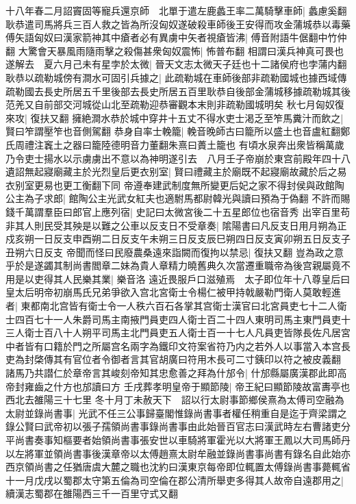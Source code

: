 十八年春二月詔竇固等寵兵還京師　北單于遣左鹿蠡王率二萬騎擊車師|{
	蠡慮奚翻}
耿恭遣司馬將兵三百人救之皆為所沒匈奴遂破殺車師後王安得而攻金蒲城恭以毒藥傅矢語匈奴曰漢家箭神其中瘡者必有異虜中矢者視瘡皆沸|{
	傅音附語牛倨翻中竹仲翻}
大驚會天暴風雨隨雨擊之殺傷甚衆匈奴震怖|{
	怖普布翻}
相謂曰漢兵神真可畏也遂解去　夏六月己未有星孛於太微|{
	晉天文志太微天子廷也十二諸侯府也孛蒲内翻}
耿恭以疏勒城傍有澗水可固引兵據之|{
	此疏勒城在車師後部非疏勒國城也據西域傳疏勒國去長史所居五千里後部去長史所居五百里耿恭自後部金蒲城移據疏勒城其後范羌又自前部交河城從山北至疏勒迎恭審觀本末則非疏勒國城明矣}
秋七月匈奴復來攻|{
	復扶又翻}
擁絶澗水恭於城中穿井十五丈不得水吏士渇乏至笮馬糞汁而飲之|{
	賢曰笮謂壓笮也音側駕翻}
恭身自率士輓籠|{
	輓音晚師古曰籠所以盛土也音盧紅翻鄭氏周禮注竁土之器曰籠陸德明音力董翻朱熹曰蕢土籠也}
有頃水泉奔出衆皆稱萬歲乃令吏士揚水以示虜虜出不意以為神明遂引去　八月壬子帝崩於東宫前殿年四十八遺詔無起寢廟藏主於光烈皇后更衣别室|{
	賢曰禮藏主於廟既不起寢廟故藏於后之易衣别室更易也更工衡翻下同}
帝遵奉建武制度無所變更后妃之家不得封侯與政館陶公主為子求郎|{
	館陶公主光武女紅夫也適駙馬都尉韓光與讀曰預為于偽翻}
不許而賜錢千萬謂羣臣曰郎官上應列宿|{
	史記曰太微宮後二十五星郎位也宿音秀}
出宰百里苟非其人則民受其殃是以難之公車以反支日不受章奏|{
	隂陽書曰凡反支日用月朔為正戍亥朔一日反支申酉朔二日反支午未朔三日反支辰巳朔四日反支寅卯朔五日反支子丑朔六日反支}
帝聞而怪曰民廢農桑遠來詣闕而復拘以禁忌|{
	復扶又翻}
豈為政之意乎於是遂蠲其制尚書閻章二妹為貴人章精力曉舊典久次當遷重職帝為後宫親屬竟不用是以吏得其人民樂其業|{
	樂音洛}
遠近畏服戶口滋殖焉　太子即位年十八尊皇后曰皇太后明帝初崩馬氏兄弟爭欲入宫北宮衛士令楊仁被甲持戟嚴勒門衛人莫敢輕進者|{
	東都南北宫皆有衛士令一人秩六百石各掌其宫衛士漢官曰北宮員吏七十二人衛士四百七十一人朱爵司馬主南掖門員吏四人衛士百二十四人東明司馬主東門員吏十三人衛士百八十人朔平司馬主北門員吏五人衛士百一十七人凡員吏皆隊長佐凡居宮中者皆有口籍於門之所屬宫名兩字為鐵印文符案省符乃内之若外人以事當入本宫長吏為封棨傳其有官位者令御者言其官胡廣曰符用木長可二寸銕印以符之被皮義翻}
諸馬乃共譛仁於章帝言其峻刻帝知其忠愈善之拜為什邡令|{
	什邡縣屬廣漢郡此即高帝封雍齒之什方也邡讀曰方}
壬戌葬孝明皇帝于顯節陵|{
	帝王紀曰顯節陵故富夀亭也西北去雒陽三十七里}
冬十月丁未赦天下　詔以行太尉事節鄉侯熹為太傅司空融為太尉並錄尚書事|{
	光武不任三公事歸臺閣惟錄尚書事者權任稍重自是迄于齊梁謂之錄公賢曰武帝初以張子孺領尚書事錄尚書事由此始晉百官志曰漢武時左右曹諸吏分平尚書奏事知樞要者始領尚書事張安世以車騎將軍霍光以大將軍王鳳以大司馬師丹以左將軍並領尚書事後漢章帝以太傅趙熹太尉牟融並錄尚書事尚書有錄名自此始亦西京領尚書之任猶唐虞大麓之職也沈約曰漢東京每帝即位輒置太傅錄尚書事薨輒省}
十一月戊戌以蜀郡太守第五倫為司空倫在郡公清所舉吏多得其人故帝自遠郡用之|{
	續漢志蜀郡在雒陽西三千一百里守式又翻}
